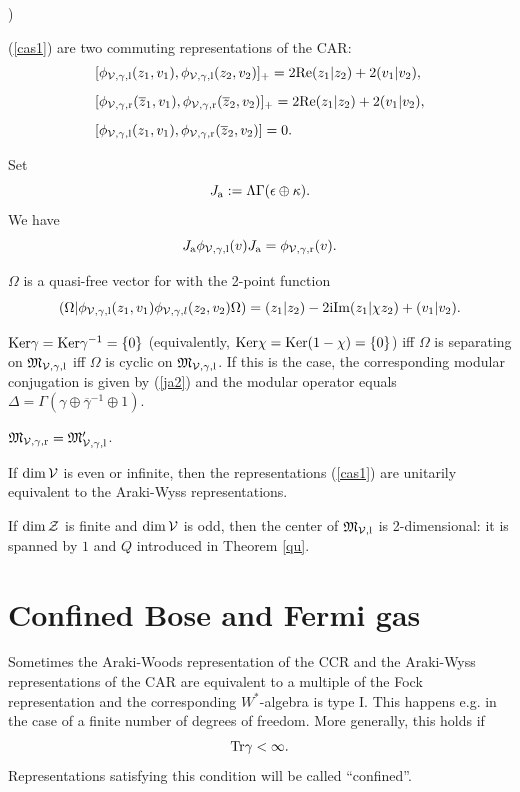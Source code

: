 \documentclass{svmult}
\newcounter{smallarabics}
\newenvironment{arabicenumerate}
{\begin{list}{{\normalfont\textrm{\arabic{smallarabics})}}}
  {\usecounter{smallarabics}\setlength{\itemindent}{0cm}
   \setlength{\leftmargin}{5ex}\setlength{\labelwidth}{4ex}
   \setlength{\topsep}{0.75\parsep}\setlength{\partopsep}{0ex}
   \setlength{\itemsep}{0ex}}}
{\end{list}}
\newcommand{\ben}{\begin{arabicenumerate}}
\newcommand{\een}{\end{arabicenumerate}}
\newcommand{\beq}{\begin{equation}}
\newcommand{\eeq}{\end{equation}}
\def\bet{\begin{theorem}}
\def\eet{\end{theorem}}
\def\Im{{\rm Im}}
\def\Re{{\rm Re}}
\def\bar{\overline}
\def\l{{\rm l}}
\def\r{{\rm r}}
\def\cZ{{\cal Z}}
\def\cV{{\cal V}}
\def\fM{{\mathfrak M}}
\def\a{{\rm a}}
\def\i{{\rm i}}
\def\Tr{{\rm Tr}}
\def\Ker{{\rm Ker}}
\def\l{{\rm l}}
\def\r{{\rm r}}
\def\Tr{{\rm Tr}}
\def\Ker{{\rm Ker}}
\begin{document}
\bet\ben\item (\ref{cas1}) are two commuting representations of the  CAR:
\[\begin{array}{l}
[\phi_{\cV,\gamma,\l}(z_1,v_1),\phi_{\cV,\gamma,\l}(z_2,v_2)]_+
=2\Re(z_1|z_2)+2(v_1|v_2),\\[3mm]
[\phi_{\cV,\gamma,\r}(\bar z_1,v_1),
\phi_{\cV,\gamma,\r}(\bar z_2,v_2)]_+=2\Re(z_1|z_2)+
2(v_1|v_2),\\[3mm]
[\phi_{\cV,\gamma,\l}( z_1,v_1),\phi_{\cV,\gamma,\r}(\bar z_2,v_2)]=0.
\end{array}\]
\item Set
\beq J_\a:=\Lambda\Gamma(\epsilon\oplus
\kappa). \label{ja2}\eeq 
We have
\[ J_\a\phi_{\cV,\gamma,\l}(v) J_\a=\phi_{\cV,\gamma,\r}(v).\]
\item $\Omega$ is a quasi-free vector for with the 2-point function
\[(\Omega|\phi_{\cV,\gamma,\l}(z_1,v_1)\phi_{\cV,\gamma,l}(z_2,v_2)\Omega)
=(z_1|z_2)-2\i\Im(z_1|\chi z_2)+
(v_1|v_2).\]
\item
$\Ker\gamma=\Ker \gamma^{-1}=\{0\}$ (equivalently, 
$\Ker\chi=\Ker(1-\chi)=\{0\}$) iff $\Omega$ is separating  on
  $\fM_{\cV,\gamma,\l}$
iff $\Omega$ is cyclic  on $\fM_{\cV,\gamma,\l}$. If this is the case,
the 
corresponding modular conjugation is given by (\ref{ja2}) and the
 modular operator
 equals 
$\Delta=\Gamma(\gamma\oplus\bar\gamma^{-1}\oplus1)$.
\item $\fM_{\cV,\gamma,\r}=\fM_{\cV,\gamma,\l}'$.
\item If $\dim\cV$ is even or infinite, then
  the  representations (\ref{cas1}) are unitarily equivalent to
  the Araki-Wyss representations.
\item If $\dim\cZ$ is finite and
$\dim\cV$ is odd, then the center of  $\fM_{\cV,\l}$
is 2-dimensional: it is spanned by $1$ and $Q$ introduced in  Theorem \ref{qu}.
\een\label{tra}\eet




\section{Confined Bose and Fermi gas}



Sometimes the Araki-Woods representation of the CCR and the Araki-Wyss 
representations of the  CAR are equivalent to a multiple of  the Fock
representation and the corresponding $W^*$-algebra is type I. 
This happens e.g.
 in the case of a finite number of degrees of freedom.
More generally, this holds if
\beq\Tr\gamma<\infty.\label{confi}\eeq
Representations satisfying this condition will be called ``confined''. 
\end{document}
